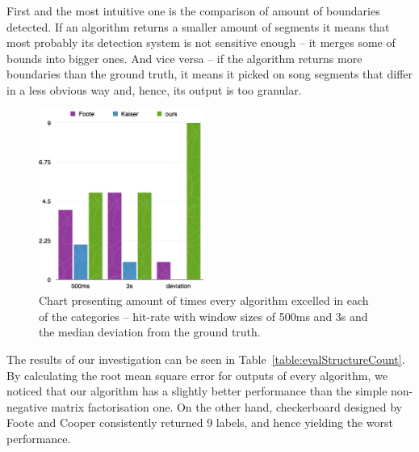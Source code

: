First and the most intuitive one is the comparison of amount of boundaries detected. If an algorithm returns a smaller amount of segments it means that most probably its detection system is not sensitive enough -- it merges some of bounds into bigger ones. And vice versa -- if the algorithm returns more boundaries than the ground truth, it means it picked on song segments that differ in a less obvious way and, hence, its output is too granular.


\begin{figure}
\vspace{-30pt}
  \begin{center}
    \includegraphics[width=0.48\textwidth]{Figures/structurechamps}
  \end{center}
  \caption{Chart presenting amount of times every algorithm excelled in each of the categories -- hit-rate with window sizes of 500ms and 3s and the median deviation from the ground truth.}
\label{fig:structurechamps}
\end{figure}


The results of our investigation can be seen in Table~\ref{table:evalStructureCount}. By calculating the root mean square error for outputs of every algorithm, we noticed that our algorithm has a slightly better performance than the simple non-negative matrix factorisation one. On the other hand, checkerboard designed by Foote and Cooper consistently returned 9 labels, and hence yielding the worst performance.


